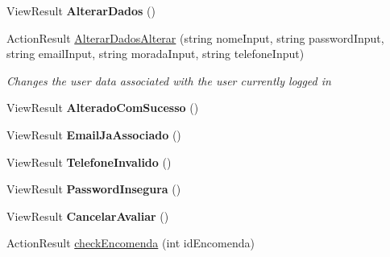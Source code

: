 \begin{DoxyCompactItemize}
\mbox{\label{classmvc_j_j_m_s_1_1_controllers_1_1_menu_cliente_controller_af438b7423cb0804aa219325081c070aa}} 
View\+Result {\bfseries Alterar\+Dados} ()
\item 
Action\+Result \mbox{\hyperlink{classmvc_j_j_m_s_1_1_controllers_1_1_menu_cliente_controller_a2d3e5123426f07356591f476a5c2e6e1}{Alterar\+Dados\+Alterar}} (string nome\+Input, string password\+Input, string email\+Input, string morada\+Input, string telefone\+Input)
\begin{DoxyCompactList}\small\item\em Changes the user data associated with the user currently logged in \end{DoxyCompactList}\item 
\mbox{\label{classmvc_j_j_m_s_1_1_controllers_1_1_menu_cliente_controller_a50b8d888b8de031e1f43c07c054bdf58}} 
View\+Result {\bfseries Alterado\+Com\+Sucesso} ()
\item 
\mbox{\label{classmvc_j_j_m_s_1_1_controllers_1_1_menu_cliente_controller_a586996d6bf82b8d0faa217148eaceaca}} 
View\+Result {\bfseries Email\+Ja\+Associado} ()
\item 
\mbox{\label{classmvc_j_j_m_s_1_1_controllers_1_1_menu_cliente_controller_a01b37f1fc945e60b337ec9288548c404}} 
View\+Result {\bfseries Telefone\+Invalido} ()
\item 
\mbox{\label{classmvc_j_j_m_s_1_1_controllers_1_1_menu_cliente_controller_af542ed6304021c156ad94acd5fed451b}} 
View\+Result {\bfseries Password\+Insegura} ()
\item 
\mbox{\label{classmvc_j_j_m_s_1_1_controllers_1_1_menu_cliente_controller_ab98994021cafc5f2d7138660fbddb56e}} 
View\+Result {\bfseries Cancelar\+Avaliar} ()
\item 
Action\+Result \mbox{\hyperlink{classmvc_j_j_m_s_1_1_controllers_1_1_menu_cliente_controller_a80c955969df7336ef727d73da76caa66}{check\+Encomenda}} (int id\+Encomenda)

\end{DoxyCompactItemize}
